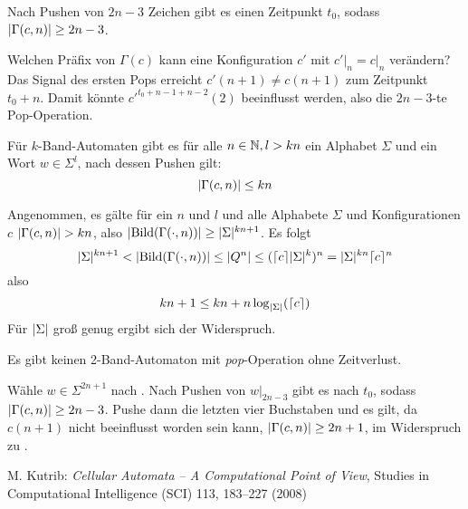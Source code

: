 \documentclass{article}
\begin{document}
\begin{satz}
    \label{thm:locontent}
    Nach Pushen von $2n-3$ Zeichen gibt es einen Zeitpunkt $t_0$, sodass $\lvert\Gamma(c,n)\rvert \geq 2n-3$.
    \begin{beweis}
        Welchen Präfix von $\Gamma(c)$ kann eine Konfiguration $c'$ mit $c' \big|_n = c \big|_n$ verändern? Das Signal des ersten Pops erreicht $c'(n+1) \neq c(n+1)$ zum Zeitpunkt $t_0+n$. Damit könnte $c'^{t_0+n-1+n-2}(2)$ beeinflusst werden, also die $2n-3$-te Pop-Operation.
    \end{beweis}
\end{satz}

\begin{satz}
    \label{cor:spacesize}
    Für $k$-Band-Automaten gibt es für alle $n \in \mathbb{N}, l > kn$ ein Alphabet $\Sigma$ und ein Wort $w \in \Sigma^l$, nach dessen Pushen gilt:
    \[ \lvert\Gamma(c,n)\rvert \leq kn \]
    \begin{beweis}
        Angenommen, es gälte für ein $n$ und $l$ und alle Alphabete $\Sigma$ und Konfigurationen $c$ $\lvert\Gamma(c,n)\rvert > kn$, also $\lvert\text{Bild}(\Gamma(\cdot,n))\rvert \geq \lvert\Sigma\rvert^{kn+1}$.
        Es folgt
        \[ \lvert\Sigma\rvert^{kn+1} < \lvert\text{Bild}(\Gamma(\cdot,n))\rvert \leq \lvert Q^n\rvert \leq (\lceil c\rceil\lvert\Sigma\rvert^k)^n = \lvert\Sigma\rvert^{kn} \lceil c\rceil^n \]
        also
        \[ kn + 1 \leq kn + n \log_{\lvert\Sigma\rvert}(\lceil c\rceil) \]
        Für $\lvert\Sigma\rvert$ groß genug ergibt sich der Widerspruch.
    \end{beweis}
\end{satz}

\begin{satz}
    Es gibt keinen 2-Band-Automaton mit \emph{pop}-Operation ohne Zeitverlust.
    \begin{beweis}
        Wähle $w \in \Sigma^{2n+1}$ nach . Nach Pushen von $w \big|_{2n-3}$ gibt es nach  $t_0$, sodass $\lvert\Gamma(c,n)\rvert \geq 2n-3$. Pushe dann die letzten vier Buchstaben und es gilt, da $c(n+1)$ nicht beeinflusst worden sein kann, $\lvert\Gamma(c,n)\rvert \geq 2n+1$, im Widerspruch zu .
    \end{beweis}
\end{satz}

\begin{thebibliography}{9}

    M. Kutrib: \emph{Cellular Automata – A Computational Point of View}, Studies in Computational Intelligence (SCI) 113, 183–227 (2008)

\end{thebibliography}
\end{document}
